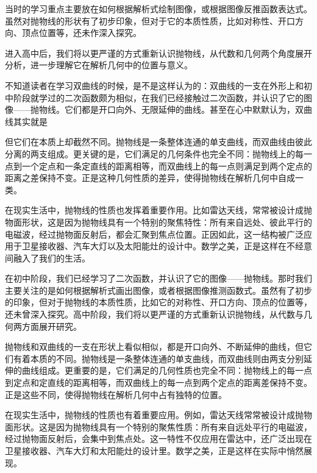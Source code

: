 
\begin{issues}
\issueDraft
\end{issues}


当时的学习重点主要放在如何根据解析式绘制图像，或根据图像反推函数表达式。虽然对抛物线的形状有了初步印象，但对于它的本质性质，比如对称性、开口方向、顶点位置等，还未作深入探究。

进入高中后，我们将以更严谨的方式重新认识抛物线，从代数和几何两个角度展开分析，进一步理解它在解析几何中的位置与意义。

不知道读者在学习双曲线的时候，是不是这样认为的：双曲线的一支在外形上和初中阶段就学过的二次函数颇为相似，在我们已经接触过二次函数，并认识了它的图像——抛物线。它们都是开口向外、无限延伸的曲线。甚至在心中默默认为，双曲线其实就是

但它们在本质上却截然不同。抛物线是一条整体连通的单支曲线，而双曲线由彼此分离的两支组成。更关键的是，它们满足的几何条件也完全不同：抛物线上的每一点到一个定点和一条定直线的距离相等，而双曲线上的每一点则满足到两个定点的距离之差保持不变。正是这种几何性质的差异，使得抛物线在解析几何中自成一类。

在现实生活中，抛物线的性质也发挥着重要作用。比如雷达天线，常常被设计成抛物面形状，这是因为抛物线具有一个特别的聚焦特性：所有来自远处、彼此平行的电磁波，经过抛物面反射后，都会汇聚到焦点位置。正因如此，这一结构被广泛应用于卫星接收器、汽车大灯以及太阳能灶的设计中。数学之美，正是这样在不经意间融入了我们的生活。

在初中阶段，我们已经学习了二次函数，并认识了它的图像——抛物线。那时我们主要关注的是如何根据解析式画出图像，或者根据图像推测函数式。虽然有了初步的印象，但对于抛物线的本质性质，比如它的对称性、开口方向、顶点的位置等，还未曾深入探究。高中阶段，我们将以更严谨的方式重新认识抛物线，从代数与几何两方面展开研究。

抛物线和双曲线的一支在形状上看似相似，都是开口向外、不断延伸的曲线，但它们有着本质的不同。抛物线是一条整体连通的单支曲线，而双曲线则由两支分别延伸的曲线组成。更重要的是，它们满足的几何性质也完全不同：抛物线上的每一点到定点和定直线的距离相等，而双曲线上的每一点到两个定点的距离差保持不变。正是这些不同，使得抛物线在解析几何中占有独特的位置。

在现实生活中，抛物线的性质也有着重要应用。例如，雷达天线常常被设计成抛物面形状。这是因为抛物线具有一个特别的聚焦性质：所有来自远处平行的电磁波，经过抛物面反射后，会集中到焦点处。这一特性不仅应用在雷达中，还广泛出现在卫星接收器、汽车大灯和太阳能灶的设计里。数学之美，正是这样在实际中悄然展现。

